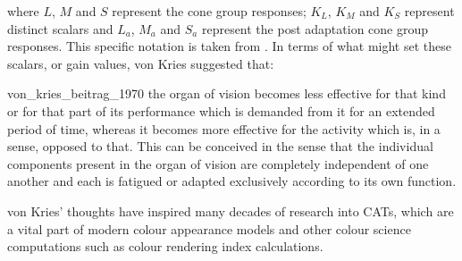 where $L$, $M$ and $S$ represent the cone group responses; $K_{L}$, $K_{M}$ and $K_{S}$ represent distinct scalars and $L_{a}$, $M_{a}$ and $S_{a}$ represent the post adaptation cone group responses. This specific notation is taken from \citet[p. 183]{fairchild_color_2013}. In terms of what might set these scalars, or gain values, von Kries suggested that: 

\begin{itquote}{von_kries_beitrag_1970}
the organ of vision becomes less effective for that kind or for that part of its performance which is demanded from it for an extended period of time, whereas it becomes more effective for the activity which is, in a sense, opposed to that. This can be conceived in the sense that the individual components present in the organ of vision are completely independent of one another and each is fatigued or adapted exclusively according to its own function.
\end{itquote}

von Kries' thoughts have inspired many decades of research into \glspl{CAT}, which are a vital part of modern colour appearance models and other colour science computations such as colour rendering index calculations. %


